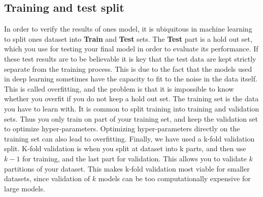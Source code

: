 \subsection{Training and  test split}
In order to verify the results of ones model, it is ubiquitous in machine learning to split ones dataset into \textbf{Train} and \textbf{Test} sets. 
The \textbf{Test} part is a hold out set, which you use for testing your final model in order to evaluate its performance. 
If these test results are to be believable it is key that the test data are kept strictly separate from the training process. 
This is due to the fact that the models used in deep learning sometimes have the capacity to fit to the noise in the data itself.
This is called overfitting, and the problem is that it is impossible to know whether you overfit if you do not keep a hold out set.
The training set is the data you have to learn with. 
It is common to split training into training and validation sets. 
Thus you only train on part of your training set, and keep the validation set to optimize hyper-parameters.
Optimizing hyper-parameters directly on the training set can also lead to overfitting.
Finally, we have used a k-fold validation split. 
K-fold validation is when you split at dataset into k parts, and then use $k-1$ for training, and the last part for validation.
This allows you to validate $k$ partitions of your dataset.
This makes k-fold validation most viable for smaller datasets, since validation of $k$ models can be too computationally expensive for large models. 
